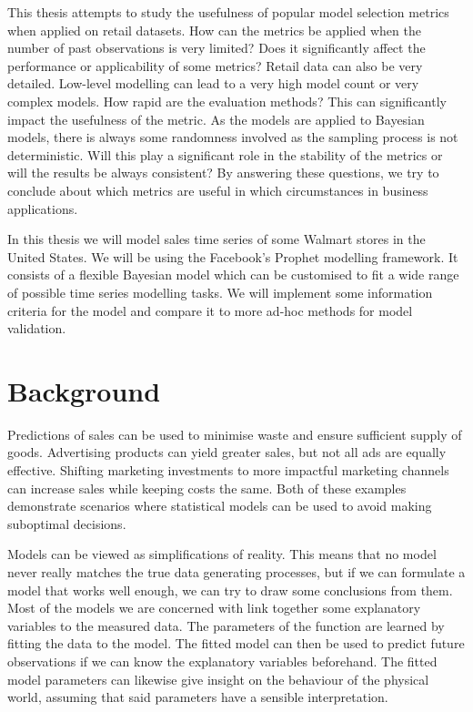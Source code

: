 \documentclass[english, 12pt, a4paper, sci, utf8, a-1b, online]{aaltothesis}
\begin{document}
\begin{abstractpage}[english]
This thesis attempts to study the usefulness of popular model selection metrics when applied on retail datasets. How can the metrics be applied when the number of past observations is very limited? Does it significantly affect the performance or applicability of some metrics? Retail data can also be very detailed. Low-level modelling can lead to a very high model count or very complex models. How rapid are the evaluation methods? This can significantly impact the usefulness of the metric. As the models are applied to Bayesian models, there is always some randomness involved as the sampling process is not deterministic. Will this play a significant role in the stability of the metrics or will the results be always consistent? By answering these questions, we try to conclude about which metrics are useful in which circumstances in business applications.

In this thesis we will model sales time series of some Walmart stores in the United States. We will be using the Facebook's Prophet modelling framework. It consists of a flexible Bayesian model which can be customised to fit a wide range of possible time series modelling tasks. We will implement some information criteria for the model and compare it to more ad-hoc methods for model validation.




\section{Background}


Predictions of sales can be used to minimise waste and ensure sufficient supply of goods. Advertising products can yield greater sales, but not all ads are equally effective. Shifting marketing investments to more impactful marketing channels can increase sales while keeping costs the same. Both of these examples demonstrate scenarios where statistical models can be used to avoid making suboptimal decisions.

Models can be viewed as simplifications of reality. This means that no model never really matches the true data generating processes, but if we can formulate a model that works well enough, we can try to draw some conclusions from them. Most of the models we are concerned with link together some explanatory variables to the measured data. The parameters of the function are learned by fitting the data to the model. The fitted model can then be used to predict future observations if we can know the explanatory variables beforehand. The fitted model parameters can likewise give insight on the behaviour of the physical world, assuming that said parameters have a sensible interpretation.


\end{abstractpage}
\end{document}

